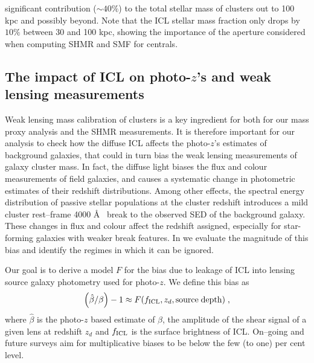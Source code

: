 {significant contribution ($\sim 40\%$) to the total stellar mass of clusters out to 100 kpc and possibly beyond. Note that the ICL stellar mass fraction only drops by $10\%$ between 30 and 100 kpc, showing the importance of the aperture considered when computing SHMR and SMF for centrals.


\subsection{The impact of ICL on photo-$z$'s and weak lensing measurements}

Weak lensing mass calibration of clusters is a key ingredient for both for our mass proxy analysis and the SHMR measurements. It is therefore important for our analysis to check how the diffuse ICL affects the photo-$z$'s estimates of background galaxies, that could in turn bias the weak lensing measurements of galaxy cluster mass. In fact, the diffuse light biases the flux and colour measurements of field galaxies, and causes a systematic change in photometric estimates of their redshift distributions. Among other effects, the spectral energy distribution of passive stellar populations at the cluster redshift introduces a mild cluster rest--frame 4000 \AA~ break to the observed SED of the background galaxy. These changes in flux and colour affect the redshift assigned, especially for star-forming galaxies with weaker break features. In \citet{gruenicl} we evaluate the magnitude of this bias and identify the regimes in which it can be ignored.

Our goal is to derive a model $F$ for the bias due to leakage of ICL into lensing source galaxy photometry used for photo-$z$. We define this bias as 
\begin{equation}
\left(\hat{\beta}/\beta\right)-1\approx F(f_{\rm ICL}, z_{d},\mathrm{source\;depth}) \; ,
\label{eqn:dbdf}
\end{equation}
where $\hat{\beta}$ is the photo-$z$ based estimate of $\beta$, the amplitude of the shear signal of a given lens at redshift $z_d$ and $f_{\rm ICL}$ is the surface brightness of ICL. %
On--going and future surveys aim for multiplicative biases to be below the few (to one) per cent level.

}
